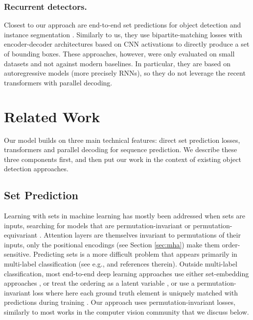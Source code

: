\subsubsection{Recurrent detectors.} 
Closest to our approach are end-to-end set predictions for object detection  \cite{Stewart2015EndtoEndPD} and instance segmentation \cite{RomeraParedes2015RecurrentIS,Park2015LearningTD,ren2017end,Salvador2017RecurrentNN}. Similarly to us, they use bipartite-matching losses with encoder-decoder architectures based on CNN activations to directly produce a set of bounding boxes. These approaches, however, were only evaluated on small datasets and not against modern baselines. In particular, they are based on autoregressive models (more precisely RNNs), so they do not leverage the recent transformers with parallel decoding.


\iffalse

\section{Related Work}

Our model builds on three main technical features:  direct set prediction losses, transformers and parallel decoding for sequence prediction. We describe these three components first, and then put our work in the context of existing object detection approaches.

\subsection{Set Prediction} Learning with sets in machine learning has mostly been addressed when sets are inputs, searching for models that are permutation-invariant \cite{zaheer2017deep,lee2018set} or permutation-equivariant \cite{ravanbakhsh2016deep,qi2017pointnet++}. Attention layers are themselves invariant to permutations of their inputs, only the positional encodings (see Section \ref{sec:mha}) make them order-sensitive. Predicting sets is a more difficult problem that appears primarily in multi-label classification (see e.g., \cite{rezatofighi2017deepsetnet,pineda2019ElucidatingIP} and references therein). Outside multi-label classification, most end-to-end deep learning approaches use either set-embedding approaches \cite{zhang2019fspool,Zhang2019DeepSP}, or treat the ordering as a latent variable \cite{rezatofighi2018deep}, or use a permutation-invariant loss where here each ground truth element is uniquely matched with predictions during training \cite{vinyals2016order}. Our approach uses permutation-invariant losses, similarly to most works in the computer vision community that we discuss below. 


